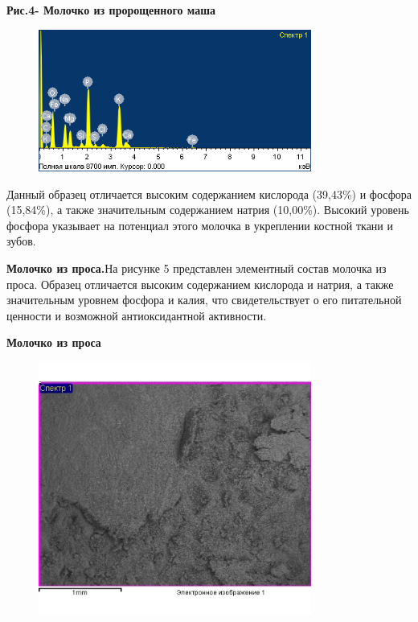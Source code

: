 {\bfseries Рис.4- Молочко из пророщенного маша}


\begin{figure}[H]
	\centering
	\includegraphics[width=0.8\textwidth]{media/pish/image50}
	\caption*{}
\end{figure}
Данный
образец отличается высоким содержанием кислорода (39,43\%) и фосфора
(15,84\%), а также значительным содержанием натрия (10,00\%). Высокий
уровень фосфора указывает на потенциал этого молочка в укреплении
костной ткани и зубов.

{\bfseries Молочко из проса.}На рисунке 5 представлен элементный состав
молочка из проса. Образец отличается высоким содержанием кислорода и
натрия, а также значительным уровнем фосфора и калия, что
свидетельствует о его питательной ценности и возможной антиоксидантной
активности.

{\bfseries Молочко из проса}

\begin{figure}[H]
	\centering
	\includegraphics[width=0.8\textwidth]{media/pish/image52}
	\caption*{}
\end{figure}

